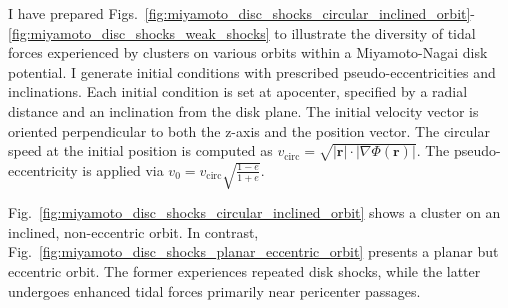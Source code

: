             I have prepared Figs.~\ref{fig:miyamoto_disc_shocks_circular_inclined_orbit}-\ref{fig:miyamoto_disc_shocks_weak_shocks} to illustrate the diversity of tidal forces experienced by clusters on various orbits within a Miyamoto-Nagai disk potential. I generate initial conditions with prescribed pseudo-eccentricities and inclinations. Each initial condition is set at apocenter, specified by a radial distance and an inclination from the disk plane. The initial velocity vector is oriented perpendicular to both the z-axis and the position vector. The circular speed at the initial position is computed as $v_\mathrm{circ} = \sqrt{|\mathbf{r}| \cdot |\nabla\Phi(\mathbf{r})|}$. The pseudo-eccentricity is applied via $v_0 =  v_\mathrm{circ} \sqrt{\frac{1 - e}{1 + e}}$.

            Fig.~\ref{fig:miyamoto_disc_shocks_circular_inclined_orbit} shows a cluster on an inclined, non-eccentric orbit. In contrast, Fig.~\ref{fig:miyamoto_disc_shocks_planar_eccentric_orbit} presents a planar but eccentric orbit. The former experiences repeated disk shocks, while the latter undergoes enhanced tidal forces primarily near pericenter passages.

